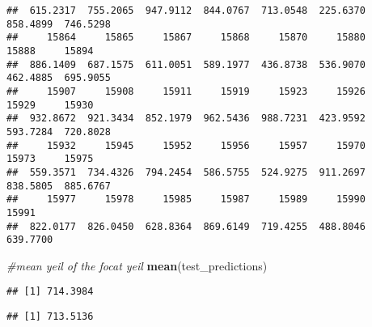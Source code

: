 \documentclass[
]{article}
\newenvironment{Shaded}{\begin{snugshade}}{\end{snugshade}}
\newcommand{\CommentTok}[1]{\textcolor[rgb]{0.56,0.35,0.01}{\textit{#1}}}
\newcommand{\DecValTok}[1]{\textcolor[rgb]{0.00,0.00,0.81}{#1}}
\newcommand{\FunctionTok}[1]{\textcolor[rgb]{0.13,0.29,0.53}{\textbf{#1}}}
\newcommand{\NormalTok}[1]{#1}
\newcommand{\OtherTok}[1]{\textcolor[rgb]{0.56,0.35,0.01}{#1}}
\newcommand{\SpecialCharTok}[1]{\textcolor[rgb]{0.81,0.36,0.00}{\textbf{#1}}}
\newcommand{\StringTok}[1]{\textcolor[rgb]{0.31,0.60,0.02}{#1}}
\begin{document}
\begin{verbatim}
##  615.2317  755.2065  947.9112  844.0767  713.0548  225.6370  858.4899  746.5298 
##     15864     15865     15867     15868     15870     15880     15888     15894 
##  886.1409  687.1575  611.0051  589.1977  436.8738  536.9070  462.4885  695.9055 
##     15907     15908     15911     15919     15923     15926     15929     15930 
##  932.8672  921.3434  852.1979  962.5436  988.7231  423.9592  593.7284  720.8028 
##     15932     15945     15952     15956     15957     15970     15973     15975 
##  559.3571  734.4326  794.2454  586.5755  524.9275  911.2697  838.5805  885.6767 
##     15977     15978     15985     15987     15989     15990     15991 
##  822.0177  826.0450  628.8364  869.6149  719.4255  488.8046  639.7700
\end{verbatim}

\begin{Shaded}
\begin{Highlighting}[]
\CommentTok{\#mean yeil of the focat yeil}
\FunctionTok{mean}\NormalTok{(test\_predictions)}
\end{Highlighting}
\end{Shaded}

\begin{verbatim}
## [1] 714.3984
\end{verbatim}

\begin{Shaded}
\end{Shaded}

\begin{verbatim}
## [1] 713.5136
\end{verbatim}

\begin{Shaded}
\end{Shaded}
\end{document}
